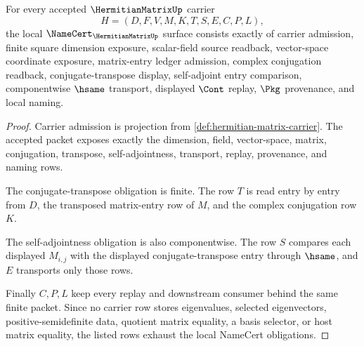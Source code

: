\begin{theorem}
\label{thm:hermitian-matrix-namecert-obligations}
For every accepted $\HermitianMatrixUp$ carrier
$$
H=(D,F,V,M,K,T,S,E,C,P,L),
$$
the local $\NameCert_{\HermitianMatrixUp}$ surface consists exactly of carrier admission, finite square dimension exposure, scalar-field source readback, vector-space coordinate exposure, matrix-entry ledger admission, complex conjugation readback, conjugate-transpose display, self-adjoint entry comparison, componentwise $\hsame$ transport, displayed $\Cont$ replay, $\Pkg$ provenance, and local naming.
\end{theorem}
\begin{proof}
Carrier admission is projection from \autoref{def:hermitian-matrix-carrier}. The accepted packet exposes exactly the dimension, field, vector-space, matrix, conjugation, transpose, self-adjointness, transport, replay, provenance, and naming rows.

The conjugate-transpose obligation is finite. The row $T$ is read entry by entry from $D$, the transposed matrix-entry row of $M$, and the complex conjugation row $K$.

The self-adjointness obligation is also componentwise. The row $S$ compares each displayed $M_{i,j}$ with the displayed conjugate-transpose entry through $\hsame$, and $E$ transports only those rows.

Finally $C,P,L$ keep every replay and downstream consumer behind the same finite packet. Since no carrier row stores eigenvalues, selected eigenvectors, positive-semidefinite data, quotient matrix equality, a basis selector, or host matrix equality, the listed rows exhaust the local NameCert obligations.
\end{proof}

